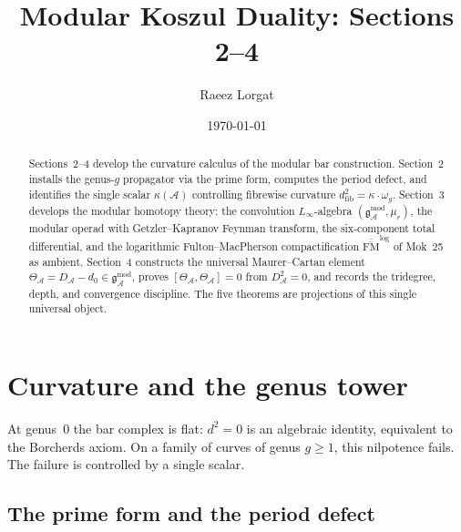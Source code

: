 \documentclass[11pt,reqno]{amsart}
\theoremstyle{definition}
\theoremstyle{remark}
\providecommand{\cA}{\mathcal{A}}
\providecommand{\FM}{\overline{\mathrm{FM}}}
\numberwithin{equation}{section}
\begin{document}
\title[Programme Summary: Sections 2--4]
{Modular Koszul Duality: Sections 2--4}

\author{Raeez Lorgat}
\address{Perimeter Institute for Theoretical Physics,
 Waterloo, ON N2L 2Y5, Canada}

\date{\today}

\begin{abstract}
Sections~2--4 develop the curvature calculus of the modular bar
construction. Section~2 installs the genus-$g$ propagator via the
prime form, computes the period defect, and identifies the single
scalar $\kappa(\cA)$ controlling fibrewise curvature
$d_{\mathrm{fib}}^2 = \kappa\cdot\omega_g$. Section~3 develops the
modular homotopy theory: the convolution $L_\infty$-algebra
$(\mathfrak{g}^{\mathrm{mod}}_\cA, \mu_r)$, the modular operad with
Getzler--Kapranov Feynman transform, the six-component total
differential, and the logarithmic Fulton--MacPherson compactification
$\overline{\FM}^{\log}$ of Mok~25 as ambient. Section~4 constructs
the universal Maurer--Cartan element
$\Theta_\cA = D_\cA - d_0 \in \mathfrak{g}^{\mathrm{mod}}_\cA$,
proves $[\Theta_\cA, \Theta_\cA] = 0$ from $D_\cA^2 = 0$, and
records the tridegree, depth, and convergence discipline. The five
theorems are projections of this single universal object.
\end{abstract}

\maketitle

\section{Curvature and the genus tower}
\label{sec:curvature}

At genus~$0$ the bar complex is flat: $d^2 = 0$ is an
algebraic identity, equivalent to the Borcherds axiom.
On a family of curves of genus $g \ge 1$, this nilpotence
fails. The failure is controlled by a single scalar.

\subsection{The prime form and the period defect}
\label{ssec:prime-form}
\end{document}
